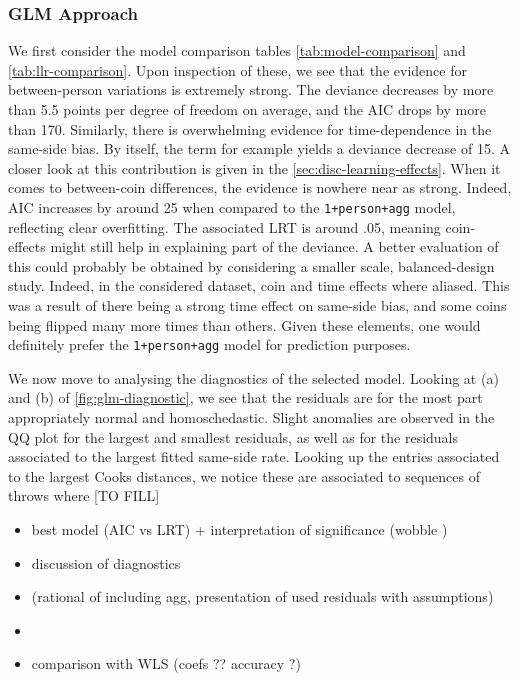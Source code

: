\documentclass[a4paper, 12pt,oneside]{article}
\begin{document}
		\subsubsection{GLM Approach}
			We first consider the model comparison tables \ref{tab:model-comparison} and \ref{tab:llr-comparison}. 
			Upon inspection of these, we see that the evidence for between-person variations is extremely strong. The deviance decreases by more than 5.5 points per degree of freedom on average, and the AIC drops by more than 170. Similarly, there is overwhelming evidence for time-dependence in the same-side bias. By itself, the term for example yields a deviance decrease of 15. A closer look at this contribution is given in the \ref{sec:disc-learning-effects}. When it comes to between-coin differences, the evidence is nowhere near as strong. Indeed, AIC increases by around 25 when compared to the \texttt{1+person+agg} model, reflecting clear overfitting. The associated LRT is around .05, meaning coin-effects might still help in explaining part of the deviance. A better evaluation of this could probably be obtained by considering a smaller scale, balanced-design study. Indeed, in the considered dataset, coin and time effects where aliased. This was a result of there being a strong time effect on same-side bias, and some coins being flipped many more times than others. 
			Given these elements, one would definitely prefer the \texttt{1+person+agg} model for prediction purposes.  

			We now move to analysing the diagnostics of the selected model. Looking at (a) and (b) of \ref{fig:glm-diagnostic}, we see that the residuals are for the most part appropriately normal and homoschedastic. Slight anomalies are observed in the QQ plot for the largest and smallest residuals, as well as for the residuals associated to the largest fitted same-side rate. Looking up the entries associated to the largest Cooks distances, we notice these are associated to sequences of throws where [TO FILL]
			\begin{itemize}
				\item best model (AIC vs LRT) + interpretation of significance (wobble )
				\item discussion of diagnostics 
				\item (rational of including agg, presentation of used residuals with assumptions)
				\item 
				\item comparison with WLS (coefs ?? accuracy ?)
			\end{itemize}
\end{document}
